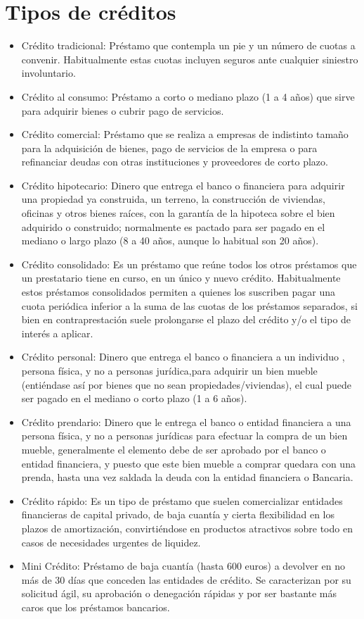 \section{Tipos de créditos}

\begin{itemize}
	\item Crédito tradicional: Préstamo que contempla un pie y un número de cuotas a convenir. Habitualmente estas cuotas incluyen seguros ante cualquier siniestro involuntario.
	\item Crédito al consumo: Préstamo a corto o mediano plazo (1 a 4 años) que sirve para adquirir bienes o cubrir pago de servicios.
	\item Crédito comercial: Préstamo que se realiza a empresas de indistinto tamaño para la adquisición de bienes, pago de servicios de la empresa o para refinanciar deudas con otras instituciones y proveedores de corto plazo.
	\item Crédito hipotecario: Dinero que entrega el banco o financiera para adquirir una propiedad ya construida, un terreno, la construcción de viviendas, oficinas y otros bienes raíces, con la garantía de la hipoteca sobre el bien adquirido o construido; normalmente es pactado para ser pagado en el mediano o largo plazo (8 a 40 años, aunque lo habitual son 20 años).
	\item Crédito consolidado: Es un préstamo que reúne todos los otros préstamos que un prestatario tiene en curso, en un único y nuevo crédito. Habitualmente estos préstamos consolidados permiten a quienes los suscriben pagar una cuota periódica inferior a la suma de las cuotas de los préstamos separados, si bien en contraprestación suele prolongarse el plazo del crédito y/o el tipo de interés a aplicar.
	\item Crédito personal: Dinero que entrega el banco o financiera a un individuo , persona física, y no a personas jurídica,para adquirir un bien mueble (entiéndase así por bienes que no sean propiedades/viviendas), el cual puede ser pagado en el mediano o corto plazo (1 a 6 años).
	\item Crédito prendario: Dinero que le entrega el banco o entidad financiera a una persona física, y no a personas jurídicas para efectuar la compra de un bien mueble, generalmente el elemento debe de ser aprobado por el banco o entidad financiera, y puesto que este bien mueble a comprar quedara con una prenda, hasta una vez saldada la deuda con la entidad financiera o Bancaria.
	\item Crédito rápido: Es un tipo de préstamo que suelen comercializar entidades financieras de capital privado, de baja cuantía y cierta flexibilidad en los plazos de amortización, convirtiéndose en productos atractivos sobre todo en casos de necesidades urgentes de liquidez.
	\item Mini Crédito: Préstamo de baja cuantía (hasta 600 euros) a devolver en no más de 30 días que conceden las entidades de crédito. Se caracterizan por su solicitud ágil, su aprobación o denegación rápidas y por ser bastante más caros que los préstamos bancarios. 
\end{itemize}
